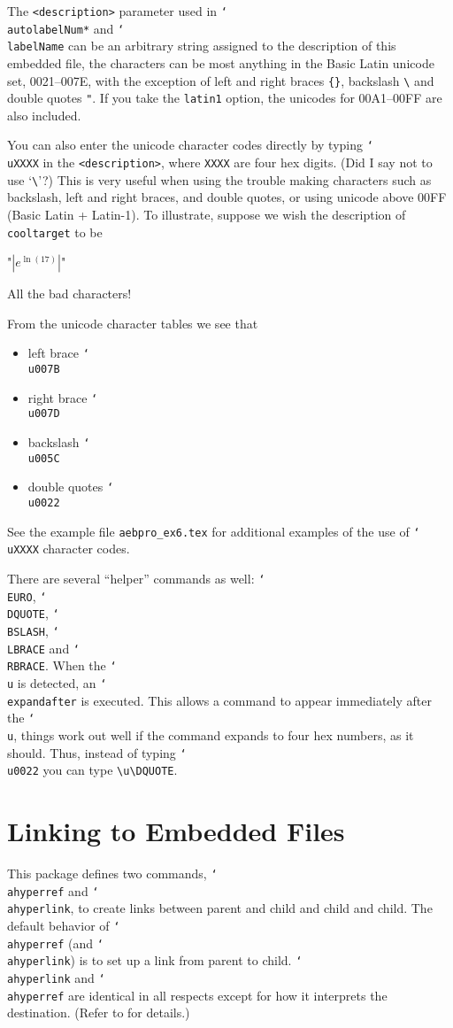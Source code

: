 \documentclass{article}
\newcommand{\cs}[1]{\texttt{\char`\\#1}}
\newcommand\newtopic{\par\ifdim\lastskip>0pt\relax\vskip-\lastskip\fi
\par\vskip6pt\noindent}
\def\aftersverbskip{\noindent}
\newenvironment{sverbatim}
{\par\small\verbatim}
{\endverbatim\par\aftergroup\aftersverbskip}
\begin{document}
\newtopic The \texttt{<description>} parameter used in
\cs{autolabelNum*} and \cs{labelName} can be an arbitrary string
assigned to the description of this embedded file, the characters
can be most anything in the Basic Latin unicode set, 0021--007E,
with the exception of left and right braces \verb!{}!, backslash
\verb!\! and double quotes \texttt{"}. If you take the
\texttt{latin1} option, the unicodes for 00A1--00FF are also
included.

You can also enter the unicode character codes directly by typing
\cs{uXXXX} in the \texttt{<description>}, where \texttt{XXXX} are four hex digits. (Did I say not
to use `\verb!\!'?) This is very useful when using the trouble making
characters such as backslash, left and right braces, and double
quotes, or using unicode above 00FF (Basic Latin + Latin-1). To illustrate, suppose we wish
the description of \texttt{cooltarget} to be
\begin{sverbatim}
    "$|e^{\ln(17)}|$"
\end{sverbatim}
All the bad characters!
\begin{sverbatim}
\end{sverbatim}
From the unicode character tables we see that
\begin{itemize}
\item  left brace \cs{u007B}
\item right brace \cs{u007D}
\item backslash \cs{u005C}
\item double quotes \cs{u0022}
\end{itemize}
See the example file \texttt{aebpro\_ex6.tex} for additional examples of the use
of \cs{uXXXX} character codes.

There are several ``helper'' commands as well: \cs{EURO}, \cs{DQUOTE}, \cs{BSLASH},
\cs{LBRACE} and \cs{RBRACE}. When the \cs{u} is detected, an \cs{expandafter} is executed.
This allows a command to appear immediately after the \cs{u}, things work out well if the
command expands to four hex numbers, as it should. Thus, instead of typing
\cs{u0022} you can type \verb!\u\DQUOTE!.

\section{Linking to Embedded Files}\label{embed}

This package defines two commands, \cs{ahyperref} and
\cs{ahyperlink}, to create links between parent and child and child
and child. The default behavior of \cs{ahyperref} (and
\cs{ahyperlink}) is to set up a link from parent to child.
\cs{ahyperlink} and \cs{ahyperref} are identical in all respects
except for how it interprets the destination. (Refer to
 for details.)
\end{document}

